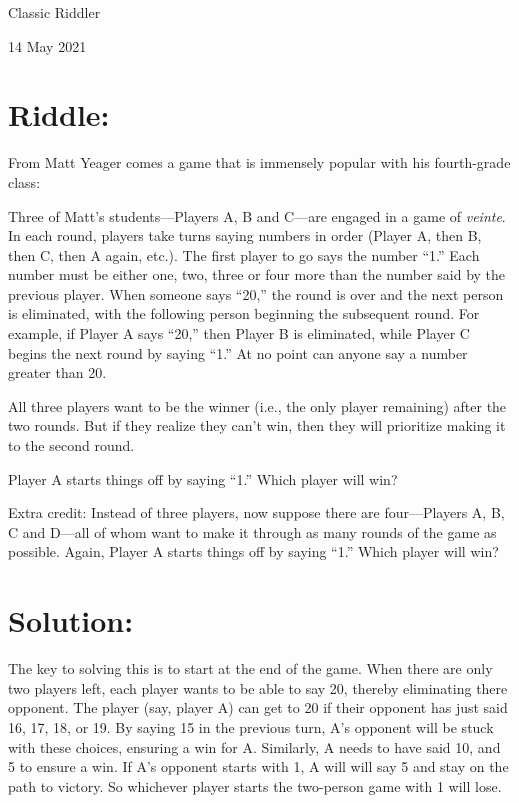 \documentclass{article}
\begin{document}
\pagestyle{empty} %

\begin{center}
{\LARGE Classic Riddler}

\vspace{0.15in}

{\Large 14 May 2021}
\end{center}


\section*{Riddle:}

From Matt Yeager comes a game that is immensely popular with his fourth-grade class:

Three of Matt's students---Players A, B and C---are engaged in a game of \textit{veinte}.
In each round, players take turns saying numbers in order (Player A, then B, then C, then A again, etc.).
The first player to go says the number ``1.''
Each number must be either one, two, three or four more than the number said by the previous player.
When someone says ``20,'' the round is over and the next person is eliminated, with the following person beginning the subsequent round.
For example, if Player A says ``20,'' then Player B is eliminated, while Player C begins the next round by saying ``1.''
At no point can anyone say a number greater than 20.

All three players want to be the winner (i.e., the only player remaining) after the two rounds.
But if they realize they can't win, then they will prioritize making it to the second round.

Player A starts things off by saying ``1.''
Which player will win?

Extra credit: Instead of three players, now suppose there are four---Players A, B, C and D---all of whom want to make it through as many rounds of the game as possible.
Again, Player A starts things off by saying ``1.''
Which player will win?



\section*{Solution:}

The key to solving this is to start at the end of the game.
When there are only two players left, each player wants to be able to say 20, thereby eliminating there opponent.
The player (say, player A) can get to 20 if their opponent has just said 16, 17, 18, or 19.
By saying 15 in the previous turn, A's opponent will be stuck with these choices, ensuring a win for A.
Similarly, A needs to have said 10, and 5 to ensure a win.
If A's opponent starts with 1, A will will say 5 and stay on the path to victory.
So whichever player starts the two-person game with 1 will lose.
\end{document}
